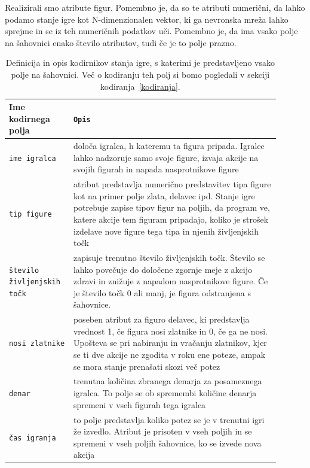 \documentclass[a4paper, 12pt]{book}
\begin{document}
Realizirali smo atribute figur. 
Pomembno je, da so te atributi numerični, da lahko podamo stanje igre kot N-dimenzionalen vektor, ki ga nevronska mreža lahko sprejme in se iz teh numeričnih podatkov uči.
Pomembno je, da ima vsako polje na šahovnici enako število atributov, tudi če je to polje prazno.

\begin{table}
	\begin{center}
		\begin{tabular}{p{0.2\linewidth}|p{0.7\linewidth}}
			Ime kodirnega polja                      & {\tt Opis} \\ \hline
			{\tt ime igralca}                        & določa igralca, h kateremu ta figura pripada. 
			 										Igralec lahko nadzoruje samo svoje figure, izvaja akcije na svojih figurah in napada nasprotnikove figure \\
			{\tt tip figure}                         & atribut predstavlja numerično predstavitev tipa figure kot na primer polje zlata, delavec ipd.
													Stanje igre potrebuje zapise tipov figur na poljih, da program ve, katere akcije tem figuram pripadajo, koliko je strošek izdelave nove figure tega tipa in njenih življenjskih točk\\
			{\tt število življenjskih točk}         & zapisuje trenutno število življenjskih točk.
													Število se lahko povečuje do določene zgornje meje z akcijo zdravi in znižuje z napadom nasprotnikove figure. Če je število točk 0 ali manj, je figura odstranjena s šahovnice. \\
			{\tt nosi zlatnike}                      & poseben atribut za figuro delavec, ki predstavlja vrednost 1, če figura nosi zlatnike in 0, če ga ne nosi.
													Upošteva se pri nabiranju in vračanju zlatnikov, kjer se ti dve akcije ne zgodita v roku ene poteze, ampak se mora stanje prenašati skozi več potez \\
			{\tt denar}                              & trenutna količina zbranega denarja za posameznega igralca.
													To polje se ob spremembi količine denarja spremeni v vseh figurah tega igralca \\
			{\tt čas igranja}                        & to polje predstavlja koliko potez se je v trenutni igri že izvedlo.
													Atribut je prisoten v vseh poljih in se spremeni v vseh poljih šahovnice, ko se izvede nova akcija \\
		\end{tabular}
	\end{center}
	\caption{Definicija in opis kodirnikov stanja igre, s katerimi je predstavljeno vsako polje na šahovnici. Več o kodiranju teh polj si bomo pogledali v sekciji kodiranja~\ref{kodiranja}.}
	\label{tableEncoders}
\end{table}
\end{document}
